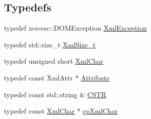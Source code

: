 \subsection*{Typedefs}
\begin{DoxyCompactItemize}
\item 
typedef xercesc\+::\+D\+O\+M\+Exception \hyperlink{namespace_d_d4hep_1_1_x_m_l_a60be75f70ac155f3f1a92aa1c69f085b}{Xml\+Exception}
\item 
typedef std\+::size\+\_\+t \hyperlink{namespace_d_d4hep_1_1_x_m_l_a0509adb4703e562548dcd1df5301f38d}{Xml\+Size\+\_\+t}
\item 
typedef unsigned short \hyperlink{namespace_d_d4hep_1_1_x_m_l_a09e5d9cc86ed782f6826dfe0778c1815}{Xml\+Char}
\item 
typedef const Xml\+Attr $\ast$ \hyperlink{namespace_d_d4hep_1_1_x_m_l_a5c19b7116be99d69b4b22d911357baaf}{Attribute}
\item 
typedef const std\+::string \& \hyperlink{namespace_d_d4hep_1_1_x_m_l_a4b167ca6b4f6763654721aef89a7089c}{C\+S\+TR}
\item 
typedef const \hyperlink{namespace_d_d4hep_1_1_x_m_l_a09e5d9cc86ed782f6826dfe0778c1815}{Xml\+Char} $\ast$ \hyperlink{namespace_d_d4hep_1_1_x_m_l_a55d8459973c11d7c20ba5a1d7ef1242c}{cp\+Xml\+Char}
\end{DoxyCompactItemize}

